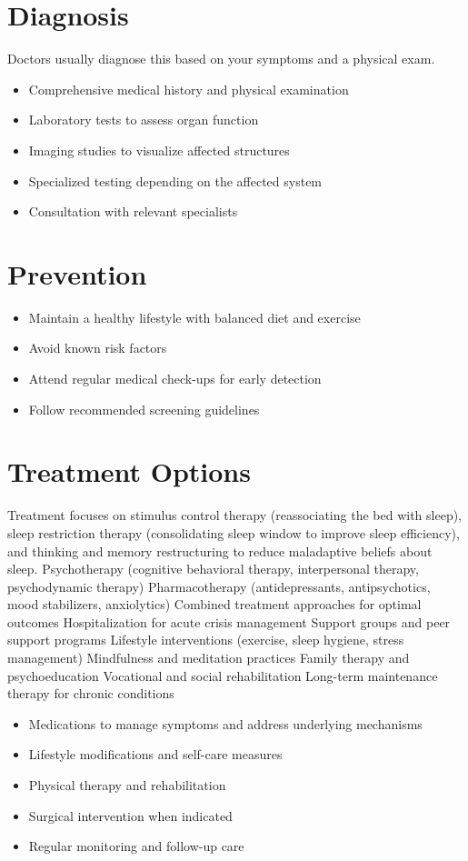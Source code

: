 \section{Diagnosis}
Doctors usually diagnose this based on your symptoms and a physical exam.

\begin{itemize}[noitemsep]
  \item Comprehensive medical history and physical examination
  \item Laboratory tests to assess organ function
  \item Imaging studies to visualize affected structures
  \item Specialized testing depending on the affected system
  \item Consultation with relevant specialists
\end{itemize}
\section{Prevention}
\begin{itemize}[noitemsep]
  \item Maintain a healthy lifestyle with balanced diet and exercise
  \item Avoid known risk factors
  \item Attend regular medical check-ups for early detection
  \item Follow recommended screening guidelines
\end{itemize}
\section{Treatment Options}
Treatment focuses on stimulus control therapy (reassociating the bed with sleep), sleep restriction therapy (consolidating sleep window to improve sleep efficiency), and thinking and memory restructuring to reduce maladaptive beliefs about sleep. Psychotherapy (cognitive behavioral therapy, interpersonal therapy, psychodynamic therapy) Pharmacotherapy (antidepressants, antipsychotics, mood stabilizers, anxiolytics) Combined treatment approaches for optimal outcomes Hospitalization for acute crisis management Support groups and peer support programs Lifestyle interventions (exercise, sleep hygiene, stress management) Mindfulness and meditation practices Family therapy and psychoeducation Vocational and social rehabilitation Long-term maintenance therapy for chronic conditions

\begin{itemize}[noitemsep]
  \item Medications to manage symptoms and address underlying mechanisms
  \item Lifestyle modifications and self-care measures
  \item Physical therapy and rehabilitation
  \item Surgical intervention when indicated
  \item Regular monitoring and follow-up care
\end{itemize}
